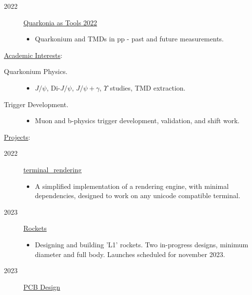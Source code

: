 \documentclass[10pt]{article}
\begin{document}
\begin{bgbox}[height=\paperheight,colback=gray,width=0.7\textwidth]
\begin{description}
\begin{description}
\begin{itemize}
            \end{itemize}
            \item[2022] \href{https://indico.cern.ch/event/1084752/}{Quarkonia as Tools 2022}
            \begin{itemize}
                \item Quarkonium and TMDs in pp - past and future measurements. 
            \end{itemize}
        \end{description}
        \item \underline{Academic Interests}:
        \begin{description}
            \item[Quarkonium Physics.]\; 
            \begin{itemize}
                \item $J/\psi$, Di-$J/\psi$, $J/\psi+\gamma$, $\Upsilon$ studies, TMD extraction.
            \end{itemize}
            \item[Trigger Development.]\; 
            \begin{itemize}
                \item Muon and b-physics trigger development, validation, and shift work.
            \end{itemize}
        \end{description}
        \item \underline{Projects}:
        \begin{description}
            \item[2022] \href{https://github.com/aihphysics/terminal_rendering}{terminal\_rendering}
            \begin{itemize}
                \item A simplified implementation of a rendering engine, with minimal dependencies, designed to work on any unicode compatible terminal.
            \end{itemize}
            \item[2023] \href{https://github.com/aihphysics/L1P}{Rockets}
            \begin{itemize}
                \item Designing and building 'L1' rockets. Two in-progress designs, minimum diameter and full body. Launches scheduled for november 2023.
            \end{itemize}
            \item[2023] \href{https://github.com/aihphysics/mini_neo_led_matrix}{PCB Design}

\end{description}
\end{description}
\end{bgbox}
\end{document}
